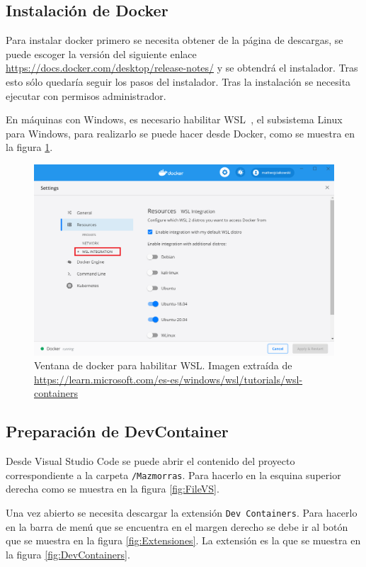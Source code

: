 \subsection{Instalación de Docker}

Para instalar docker primero se necesita obtener de la página de descargas, se puede escoger la versión del siguiente enlace \url{https://docs.docker.com/desktop/release-notes/} y se obtendrá el instalador.
Tras esto sólo quedaría seguir los pasos del instalador. Tras la instalación se necesita ejecutar con permisos administrador.

En máquinas con Windows, es necesario habilitar WSL~\cite{wslContainers}, el subsistema Linux para Windows, para realizarlo se puede hacer desde Docker, como se muestra en la figura \ref{fig:dockerdashboard}.

\begin{figure}[!h]  
    \centering  
    \includegraphics[width=\textwidth]{img/docker-dashboard.png}  
    \caption{Ventana de docker para habilitar WSL. Imagen extraída de \url{https://learn.microsoft.com/es-es/windows/wsl/tutorials/wsl-containers}}  
    \label{fig:dockerdashboard}
\end{figure}


\subsection{Preparación de DevContainer}

Desde Visual Studio Code se puede abrir el contenido del proyecto correspondiente a la carpeta \texttt{/Mazmorras}. Para hacerlo en la esquina superior derecha como se muestra en la figura \ref{fig:FileVS}.

Una vez abierto se necesita descargar la extensión \texttt{Dev Containers}. Para hacerlo en la barra de menú que se encuentra en el margen derecho se debe ir al botón que se muestra en la figura \ref{fig:Extensiones}.
La extensión es la que se muestra en la figura \ref{fig:DevContainers}.


